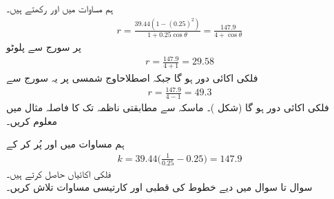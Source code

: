 ہم  مساوات  میں  اور  رکھتے ہیں۔
\begin{align*}
r=\frac{39.44(1-(0.25)^2)}{1+0.25\cos\theta}=\frac{147.9}{4+\cos\theta}
\end{align*}
 پر سورج سے پلوٹو
\begin{align*}
r=\frac{147.9}{4+1}=29.58
\end{align*}
فلکی اکائی دور ہو گا جبکہ اصطلاح{اوج شمسی} پر یہ سورج سے
\begin{align*}
r=\frac{147.9}{4-1}=49.3
\end{align*}
فلکی اکائی  دور ہو گا (شکل )۔
 ماسکہ سے مطابقتی ناظمہ تک کا  فاصلہ مثال  میں معلوم کریں۔

ہم مساوات  میں  اور  پُر کر کے
\begin{align*}
k=39.44\big(\frac{1}{0.25}-0.25\big)=147.9
\end{align*}
فلکی اکائیاں حاصل کرتے ہیں۔
\\
سوال   تا سوال  میں دیے خطوط کی قطبی اور کارتیسی مساوات تلاش کریں۔ 

